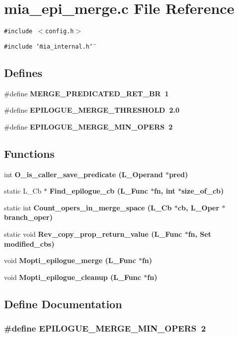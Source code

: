 \section{mia\_\-epi\_\-merge.c File Reference}
\label{mia__epi__merge_8c}
{\tt \#include $<$config.h$>$}\par
{\tt \#include \char`\"{}mia\_\-internal.h\char`\"{}}\par
\subsection*{Defines}
\begin{CompactItemize}
\item 
\#define \bf{MERGE\_\-PREDICATED\_\-RET\_\-BR}~1
\item 
\#define \bf{EPILOGUE\_\-MERGE\_\-THRESHOLD}~2.0
\item 
\#define \bf{EPILOGUE\_\-MERGE\_\-MIN\_\-OPERS}~2
\end{CompactItemize}
\subsection*{Functions}
\begin{CompactItemize}
\item 
int \bf{O\_\-is\_\-caller\_\-save\_\-predicate} (L\_\-Operand $\ast$pred)
\item 
static L\_\-Cb $\ast$ \bf{Find\_\-epilogue\_\-cb} (L\_\-Func $\ast$fn, int $\ast$size\_\-of\_\-cb)
\item 
static int \bf{Count\_\-opers\_\-in\_\-merge\_\-space} (L\_\-Cb $\ast$cb, L\_\-Oper $\ast$branch\_\-oper)
\item 
static void \bf{Rev\_\-copy\_\-prop\_\-return\_\-value} (L\_\-Func $\ast$fn, Set modified\_\-cbs)
\item 
void \bf{Mopti\_\-epilogue\_\-merge} (L\_\-Func $\ast$fn)
\item 
void \bf{Mopti\_\-epilogue\_\-cleanup} (L\_\-Func $\ast$fn)
\end{CompactItemize}


\subsection{Define Documentation}
\subsubsection{\setlength{\rightskip}{0pt plus 5cm}\#define EPILOGUE\_\-MERGE\_\-MIN\_\-OPERS~2}\label{mia__epi__merge_8c_0ab090753065d494d494ed2af5e6bc79}




